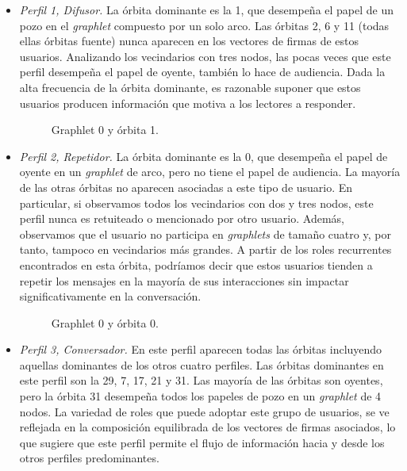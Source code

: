 \begin{itemize} 

\item \emph{Perfil 1, Difusor.} La órbita dominante es la 1, que desempeña el papel de un pozo en el \textit{graphlet} compuesto por un solo arco. Las órbitas 2, 6 y 11 (todas ellas órbitas fuente) nunca aparecen en los vectores de firmas de estos usuarios. Analizando los vecindarios con tres nodos, las pocas veces que este perfil desempeña el papel de oyente, también lo hace de audiencia. Dada la alta frecuencia de la órbita dominante, es razonable suponer que estos usuarios producen información que motiva a los lectores a responder. 
\begin{figure}[htbp]
   \centering
   
    \caption{Graphlet 0 y órbita 1.}
    \label{img:web-comp}
\end{figure}

\item \emph{Perfil 2, Repetidor.} La órbita dominante es la 0, que desempeña el papel de oyente en un \textit{graphlet} de arco, pero no tiene el papel de audiencia. La mayoría de las otras órbitas no aparecen asociadas a este tipo de usuario. En particular, si observamos todos los vecindarios con dos y tres nodos, este perfil nunca es retuiteado o mencionado por otro usuario. Además, observamos que el usuario no participa en \textit{graphlets} de tamaño cuatro y, por tanto, tampoco en vecindarios más grandes. A partir de los roles recurrentes encontrados en esta órbita, podríamos decir que estos usuarios tienden a repetir los mensajes en la mayoría de sus interacciones sin impactar significativamente en la conversación. \begin{figure}[htbp]
   \centering
   
    \caption{Graphlet 0 y órbita 0.}
    \label{img:web-comp}
\end{figure}

\item \emph{Perfil 3, Conversador.} En este perfil aparecen todas las órbitas incluyendo aquellas dominantes de los otros cuatro perfiles. Las órbitas dominantes en este perfil son la 29, 7, 17, 21 y 31. Las mayoría de las órbitas son oyentes, pero la órbita 31 desempeña todos los papeles de pozo en un \textit{graphlet} de 4 nodos. La variedad de roles que puede adoptar este grupo de usuarios, se ve reflejada en la composición equilibrada de los vectores de firmas asociados, lo que sugiere que este perfil permite el flujo de información hacia y desde los otros perfiles predominantes.
    

\end{itemize}
